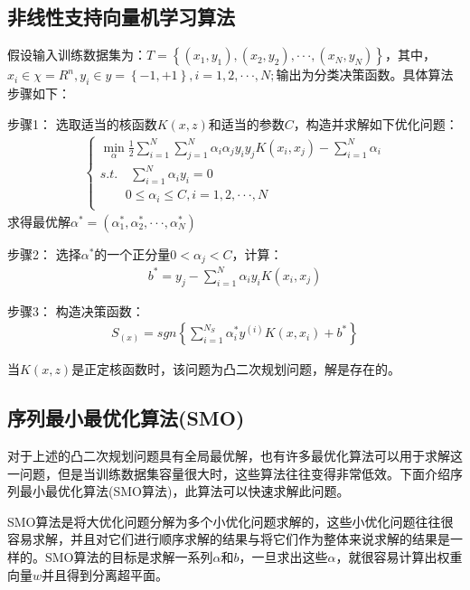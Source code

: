 \documentclass[12pt,a4paper]{article}%
\begin{document}
	\subsection{非线性支持向量机学习算法}
	假设输入训练数据集为：$T=\left\{({x}_{1},{y}_{1}),({x}_{2},{y}_{2}),···,({x}_{N},{y}_{N}) \right\}$，其中，${x}_{i}\in\chi={R}^{n},{y}_{i}\in y=\left\{-1,+1\right\},i=1,2,···,N;$输出为分类决策函数。具体算法步骤如下：
	
	步骤1：
	选取适当的核函数$K(x,z)$和适当的参数$C$，构造并求解如下优化问题：
	\begin{align}
		\begin{cases} \min\limits_{\alpha} \frac{1}{2} 
			\sum_{i=1}^{N} {\sum_{j=1}^{N} {{\alpha}_{i}{\alpha}_{j}{y}_{i}{y}_{j}K({x}_{i},{x}_{j})}}-\sum_{i=1}^{N} {\alpha}_{i} \\ s.t.\quad	\sum_{i=1}^{N} {{\alpha}_{i}{y}_{i}}=0\\
			{	\qquad	} 0\leq{\alpha}_{i}\leq C,i=1,2,···,N \\ \end{cases} 
	\end{align}
	求得最优解${\alpha}^{*}=({\alpha}_{1}^{*},{\alpha}_{2}^{*},···, {\alpha}_{N}^{*})$
	
	步骤2：
	选择${\alpha}^{*}$的一个正分量$0<{\alpha}_{j}<{C}$，计算：
	\begin{align}
		{b}^{*}={y}_{j}-\sum_{i=1}^{N} {{\alpha}_{i}{y}_{i}K({x}_{i},{x}_{j})}
	\end{align}
	
	步骤3：
	构造决策函数：
	\begin{align}
		{S}_{(x)}=sgn\left\{\sum_{i=1}^{{N}_{S}} {\alpha}_{i}^{*}{y}^{(i)}K(x,{x}_{i})+{b}^{*}\right\}
	\end{align}
	
	当$K(x,z)$是正定核函数时，该问题为凸二次规划问题，解是存在的。
	\subsection{序列最小最优化算法(SMO)}
	对于上述的凸二次规划问题具有全局最优解，也有许多最优化算法可以用于求解这一问题，但是当训练数据集容量很大时，这些算法往往变得非常低效。下面介绍序列最小最优化算法(SMO算法)，此算法可以快速求解此问题。
	
	SMO算法是将大优化问题分解为多个小优化问题求解的，这些小优化问题往往很容易求解，并且对它们进行顺序求解的结果与将它们作为整体来说求解的结果是一样的。SMO算法的目标是求解一系列$\alpha$和$b$，一旦求出这些$\alpha$，就很容易计算出权重向量$w$并且得到分离超平面。
	
\end{document}
